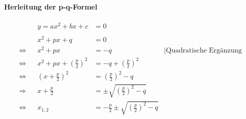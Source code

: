 \paragraph{Herleitung der p-q-Formel}

\begin{align*}
	                &  & y = a x^2 + b x +c                      & = 0                                                                                             \\
	\\
	                &  & x^2 + px + q                            & = 0                                                                                             \\
	\Leftrightarrow &  & x^2 + px                                & = -q                                                       & \mid \text{Quadratische Ergänzung} \\
	\Leftrightarrow &  & x^2 + px + {\left(\frac{p}{2}\right)}^2 & = -q + {\left(\frac{p}{2}\right)}^2                                                             \\
	\Leftrightarrow &  & {\left( x+\frac{p}{2} \right)}^2        & = {\left(\frac{p}{2}\right)}^2 - q                                                              \\
	\Rightarrow     &  & x + \frac{p}{2}                         & = \pm \sqrt{{\left(\frac{p}{2}\right)}^2 - q}                                                   \\
	\Leftrightarrow &  & x_{1,2}                                 & = -\frac{p}{2} \pm \sqrt{{\left(\frac{p}{2}\right)}^2 - q}
\end{align*}

